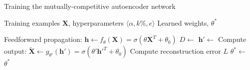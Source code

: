 %
%
%
%
%

\begin{algorithm}[!h]
\caption{Training the mutually-competitive autoencoder network}
\label{algo:mc_training}
\begin{algorithmic}[1]

\INPUT Training examples $\mathbf{X}$, hyperparameters $\langle\alpha, k\%, e\rangle$
\OUTPUT Learned weights, $\theta^{\ast}$

\item[]
    \State Feedforward propagation: $\mathbf{h} \gets f_{\theta}(\mathbf{X}) =
    \sigma(\theta\mathbf{X}^{T}+\theta_{0})$
    \State $D \gets$ 
    \State $\mathbf{h'} \gets$ 
    \State Compute output: $\mathbf{\widetilde{X}} \gets 
    g_{\theta'}(\mathbf{h'}) = \sigma(\theta'\mathbf{h'}^{T}+\theta_{0})$
    \State Compute reconstruction error $L$
    \State $\theta^{\ast} \gets$ 
\EndFor
\State \Return $\theta^{\ast}$ 

\end{algorithmic}
\end{algorithm}


